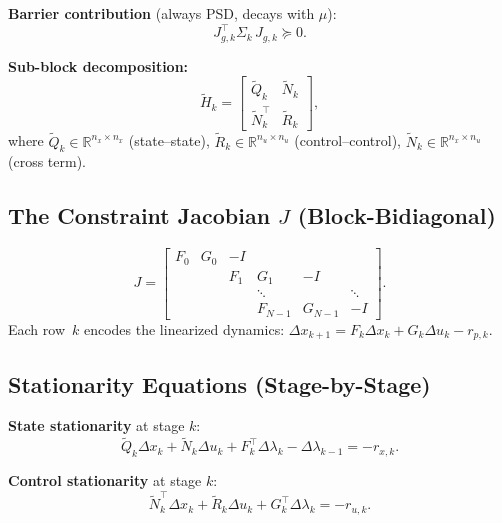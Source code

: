 \documentclass[11pt]{article}
\begin{document}
\textbf{Barrier contribution} (always PSD, decays with $\mu$):
\begin{equation}
  J_{g,k}^\top \Sigma_k\, J_{g,k} \succeq 0.
\end{equation}

\textbf{Sub-block decomposition:}
\begin{equation}\label{eq:Hk_blocks}
  \tilde{H}_k = \begin{bmatrix} \tilde{Q}_k & \tilde{N}_k \\
                                 \tilde{N}_k^\top & \tilde{R}_k \end{bmatrix},
\end{equation}
where $\tilde{Q}_k \in \mathbb{R}^{n_x \times n_x}$ (state--state),
$\tilde{R}_k \in \mathbb{R}^{n_u \times n_u}$ (control--control),
$\tilde{N}_k \in \mathbb{R}^{n_x \times n_u}$ (cross term).


\subsection{The Constraint Jacobian $J$ (Block-Bidiagonal)}

\begin{equation}\label{eq:J}
  J = \begin{bmatrix}
    F_0 & G_0 & -I &     &     &    \\
        &     & F_1 & G_1 & -I &    \\
        &     &     & \ddots &   & \ddots \\
        &     &     & F_{N-1} & G_{N-1} & -I
  \end{bmatrix}.
\end{equation}
Each row~$k$ encodes the linearized dynamics:
$\Delta x_{k+1} = F_k \Delta x_k + G_k \Delta u_k - r_{p,k}$.


\subsection{Stationarity Equations (Stage-by-Stage)}

\textbf{State stationarity} at stage $k$:
\begin{equation}\label{eq:stat_x}
  \tilde{Q}_k \Delta x_k + \tilde{N}_k \Delta u_k
  + F_k^\top \Delta \lambda_k - \Delta \lambda_{k-1} = -r_{x,k}.
\end{equation}

\textbf{Control stationarity} at stage $k$:
\begin{equation}\label{eq:stat_u}
  \tilde{N}_k^\top \Delta x_k + \tilde{R}_k \Delta u_k
  + G_k^\top \Delta \lambda_k = -r_{u,k}.
\end{equation}
\end{document}
